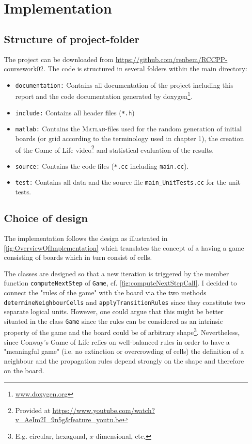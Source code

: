 \chapter{Implementation}


\section{Structure of project-folder}
The project can be downloaded from \url{https://github.com/renbem/RCCPP-coursework02}. The code is structured in several folders within the main directory:
\begin{itemize}
	\item \texttt{documentation:} Contains all documentation of the project including this report and the code documentation generated by doxygen\footnote{\url{www.doxygen.org}}.
	\item \texttt{include:} Contains all header files (\texttt{*.h})
	\item \texttt{matlab:} Contains the \textsc{Matlab}-files used for the random generation of initial boards (or grid according to the terminology used in chapter 1), the creation of the Game of Life video\footnote{Provided at \url{https://www.youtube.com/watch?v=AeIm2I_9n5g&feature=youtu.be}} and statistical evaluation of the results.
	\item \texttt{source:} Contains the code files (\texttt{*.cc} including \texttt{main.cc}).
	\item \texttt{test:} Contains all data and the source file \texttt{main\_UnitTests.cc} for the unit tests.
\end{itemize}

\section{Choice of design}
The implementation follows the design as illustrated in \cref{fig:OverviewOfImplementation} which translates the concept of a having a game consisting of boards which in turn consist of cells.

The classes are designed so that a new iteration is triggered by the member function \texttt{computeNextStep} of \texttt{Game}, cf. \cref{fig:computeNextStepCall}. I decided to connect the "rules of the game" with the board via the two methods \texttt{determineNeighbourCells} and \texttt{applyTransitionRules} since they constitute two separate logical units. However, one could argue that this might be better situated in the class \texttt{Game} since the rules can be considered as an intrinsic property of the game and the board could be of arbitrary shape\footnote{E.g. circular, hexagonal, $x$-dimensional, etc.}. Nevertheless, since Conway's Game of Life relies on well-balanced rules in order to have a "meaningful game" (i.e. no extinction or overcrowding of cells) the definition of a neighbour and the propagation rules depend strongly on the shape and therefore on the board.

